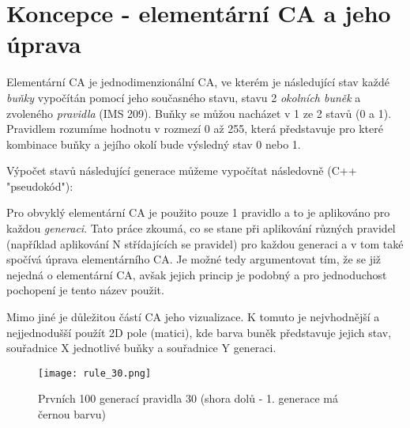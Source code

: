 \section{Koncepce - elementární CA a jeho úprava}
Elementární CA je jednodimenzionální CA, ve kterém je následující stav každé
\textit{buňky} vypočítán pomocí jeho současného stavu, stavu 2
\textit{okolních buněk} a zvoleného \textit{pravidla} (IMS 209).
Buňky se můžou nacházet v 1 ze 2 stavů (0 a 1).
Pravidlem rozumíme hodnotu v rozmezí 0 až 255, která představuje
pro které kombinace buňky a jejího okolí bude výsledný stav 0 nebo 1.

Výpočet stavů následující generace můžeme vypočítat následovně (C++ "pseudokód"):

Pro obvyklý elementární CA je použito pouze 1 pravidlo a to je aplikováno
pro každou \textit{generaci}.
Tato práce zkoumá, co se stane při aplikování různých pravidel (například
aplikování N střídajících se pravidel) pro každou generaci a v tom také
spočívá úprava elementárního CA. Je možné tedy argumentovat tím, že se již
nejedná o elementární CA, avšak jejich princip je podobný a pro jednoduchost
pochopení je tento název použit.

Mimo jiné je důležitou částí CA jeho vizualizace. K tomuto je nejvhodnější
a nejjednodušší použít 2D pole (matici), kde barva buněk představuje jejich stav,
souřadnice X jednotlivé buňky a souřadnice Y generaci.

\begin{figure}[h]
	\centering
	\texttt{[image: rule\_30.png]}
	\caption{Prvních 100 generací pravidla 30 (shora dolů - 1. generace
	má černou barvu)}
\end{figure}

